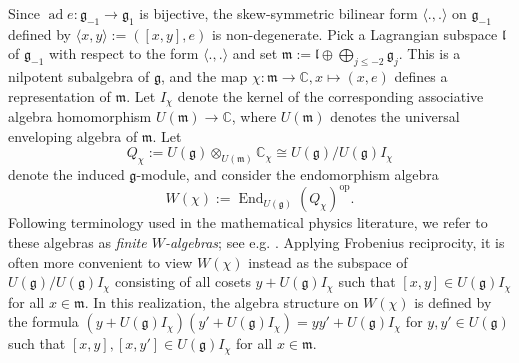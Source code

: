 \documentclass[twoside,12pt,reqno]{amsart}
\def\op{\operatorname{op}}
\def\C{{\mathbb C}}
\def\ad{\operatorname{ad}}
\def\End{{\operatorname{End}}}
\def\elly{\mathfrak{l}}
\begin{document}
Since
$\ad e:\mathfrak{g}_{-1} \rightarrow \mathfrak{g}_1$
is bijective, the skew-symmetric bilinear 
form $\langle.,.\rangle$ on $\mathfrak{g}_{-1}$
defined by $\langle x,y \rangle := ([x,y],e)$ is non-degenerate.
Pick a Lagrangian subspace $\elly$ of $\mathfrak{g}_{-1}$
with respect to the form $\langle.,.\rangle$ and set
$\mathfrak{m} := \elly \oplus \bigoplus_{j \leq -2} \mathfrak{g}_j$.
This is a nilpotent subalgebra of $\mathfrak{g}$, and 
the map $\chi:\mathfrak{m} \rightarrow \C, x \mapsto (x,e)$ 
defines a representation of $\mathfrak{m}$. Let $I_\chi$ denote the kernel
of the corresponding associative algebra homomorphism 
$U(\mathfrak{m}) \rightarrow \C$,
where $U(\mathfrak{m})$ denotes the universal enveloping algebra of
$\mathfrak{m}$. Let
\begin{equation*}
Q_\chi := 
U(\mathfrak{g}) \otimes_{U(\mathfrak{m})} \C_\chi
\cong
U(\mathfrak{g}) / U(\mathfrak{g}) I_\chi
\end{equation*}
denote the induced $\mathfrak{g}$-module, and 
consider the endomorphism algebra
\begin{equation*}
W(\chi) := \End_{U(\mathfrak{g})}(Q_\chi)^{\op}.
\end{equation*}
Following terminology used in the mathematical physics literature,
we refer to these algebras as {\em finite $W$-algebras}; see e.g. \cite{BT}.
Applying Frobenius reciprocity, it is often more convenient to view
$W(\chi)$ instead as the subspace
of $U(\mathfrak{g}) / U(\mathfrak{g}) I_\chi$ consisting of all
cosets $y + U(\mathfrak{g}) I_\chi$ such that
$[x,y] \in U(\mathfrak{g}) I_\chi$ for all $x \in \mathfrak{m}$.
In this realization, the algebra structure on
$W(\chi)$ is defined by the formula
$(y + U(\mathfrak{g}) I_\chi)(y' + U(\mathfrak{g}) I_\chi)
= yy' + U(\mathfrak{g}) I_\chi$ for $y,y' \in U(\mathfrak{g})$
such that $[x,y], [x,y'] \in U(\mathfrak{g})I_\chi$ for
all $x \in \mathfrak{m}$.
\end{document}
